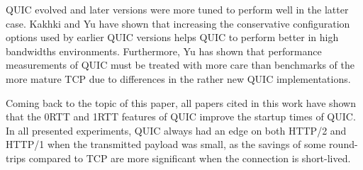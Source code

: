 \documentclass[conference]{IEEEtran}
\begin{document}
QUIC evolved and later versions were more tuned to perform well in the latter case. Kakhki \cite{Kakhki} and Yu \cite{Yu2} have shown that increasing the conservative configuration options used by earlier QUIC versions helps QUIC to perform better in high bandwidths environments. Furthermore, Yu has shown that performance measurements of QUIC must be treated with more care than benchmarks of the more mature TCP due to differences in the rather new QUIC implementations. 

Coming back to the topic of this paper, all papers cited in this work have shown that the 0RTT and 1RTT features of QUIC improve the startup times of QUIC. In all presented experiments, QUIC always had an edge on both HTTP/2 and HTTP/1 when the transmitted payload was small, as the savings of some round-trips compared to TCP are more significant when the connection is short-lived.



\end{document}
